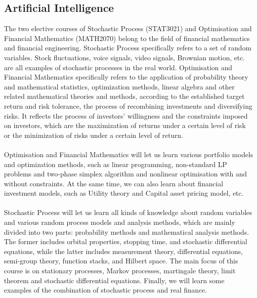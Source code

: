 \documentclass{article}
\begin{document}
	\subsection{Artificial Intelligence}
	The two elective courses of Stochastic Process (STAT3021) and Optimisation and Financial Mathematics (MATH2070) belong to the field of financial mathematics and financial engineering. Stochastic Process specifically refers to a set of random variables. Stock fluctuations, voice signals, video signals, Brownian motion, etc. are all examples of stochastic processes in the real world. Optimisation and Financial Mathematics specifically refers to the application of probability theory and mathematical statistics, optimization methods, linear algebra and other related mathematical theories and methods, according to the established target return and risk tolerance, the process of recombining investments and diversifying risks. It reflects the process of investors’ willingness and the constraints imposed on investors, which are the maximization of returns under a certain level of risk or the minimization of risks under a certain level of return.\\
    \\
    Optimisation and Financial Mathematics will let us learn various portfolio models and optimization methods, such as linear programming, non-standard LP problems and two-phase simplex algorithm and nonlinear optimisation with and without constraints. At the same time, we can also learn about financial investment models, such as Utility theory and Capital asset pricing model, etc. \\
    \\
    Stochastic Process will let us learn all kinds of knowledge about random variables and various random process models and analysis methods, which are mainly divided into two parts: probability methods and mathematical analysis methods. The former includes orbital properties, stopping time, and stochastic differential equations, while the latter includes measurement theory, differential equations, semi-group theory, function stacks, and Hilbert space. The main focus of this course is on stationary processes, Markov processes, martingale theory, limit theorem and stochastic differential equations. Finally, we will learn some examples of the combination of stochastic process and real finance.\\
    \\
\end{document}
